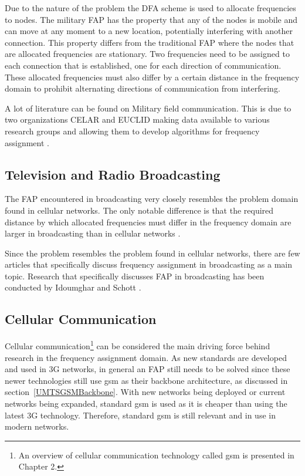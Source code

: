 Due to the nature of the problem the \gls{DFA} scheme is used to allocate frequencies to nodes. The military \gls{FAP} has the property that any of the nodes is mobile and can move at any moment to a new location, potentially interfering with another connection\cite{CALMA,DynamicFAP}. This property differs from the traditional \gls{FAP} where the nodes that are allocated frequencies are stationary\cite{CALMA}. Two frequencies need to be assigned to each connection that is established, one for each direction of communication. These allocated frequencies must also differ by a certain distance in the frequency domain to prohibit alternating directions of communication from interfering\cite{CALMA,DynamicFAP}.

A lot of literature can be found on Military field communication. This is due to two organizations CELAR and \gls{EUCLID} making data available to various research groups and allowing them to develop algorithms for frequency assignment \cite{CALMA,DynamicFAP}. 

\subsection{Television and Radio Broadcasting}
The \gls{FAP} encountered in broadcasting very closely resembles the problem domain found in cellular networks\cite{Karen2004}. The only notable difference is that the required distance by which allocated frequencies must differ in the frequency domain are larger in broadcasting than in cellular networks \cite{Karen2004}.

Since the problem resembles the problem found in cellular networks, there are few articles that specifically discuss frequency assignment in broadcasting as a main topic. Research that specifically discusses \gls{FAP} in broadcasting has been conducted by Idoumghar and Schott \cite{RadioFAP}.
\subsection{Cellular Communication}
Cellular communication\footnote{An overview of cellular communication technology called \gls{gsm} is presented in Chapter 2.} can be considered the main driving force behind research in the frequency assignment domain. As new standards are developed and used in 3G networks, in general an \gls{FAP} still needs to be solved since these newer technologies still use \gls{gsm} as their backbone architecture, as discussed in section~\ref{UMTSGSMBackbone}. With new networks being deployed or current networks being expanded, standard \gls{gsm} is used as it is cheaper than using the latest 3G technology. Therefore, standard \gls{gsm} is still relevant and in use in modern networks.

